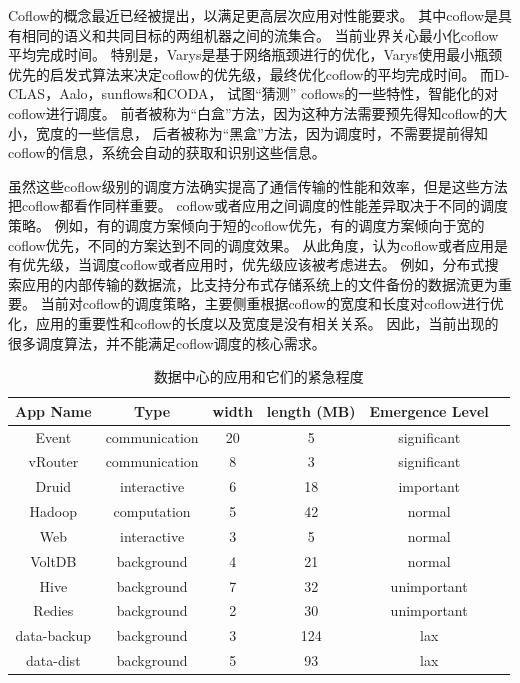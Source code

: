 Coflow的概念最近已经被提出\cite{chowdhury2012coflow}，以满足更高层次应用对性能要求。
其中coflow是具有相同的语义和共同目标的两组机器之间的流集合。
当前业界关心最小化coflow平均完成时间。
特别是，Varys是基于网络瓶颈进行的优化，Varys使用最小瓶颈优先的启发式算法来决定coflow的优先级，最终优化coflow的平均完成时间。
而D-CLAS\cite{luo2016towards}，Aalo\cite{chowdhury2015efficient}，sunflows\cite{huang2016sunflow}和CODA\cite{zhang2016coda}，
试图“猜测” coflows的一些特性，智能化的对coflow进行调度。
前者被称为“白盒”方法，因为这种方法需要预先得知coflow的大小，宽度的一些信息，
后者被称为“黑盒”方法，因为调度时，不需要提前得知coflow的信息，系统会自动的获取和识别这些信息。


虽然这些coflow级别的调度方法确实提高了通信传输的性能和效率，但是这些方法把coflow都看作同样重要。
coflow或者应用之间调度的性能差异取决于不同的调度策略。
例如，有的调度方案倾向于短的coflow优先，有的调度方案倾向于宽的coflow优先，不同的方案达到不同的调度效果。
从此角度，认为coflow或者应用是有优先级，当调度coflow或者应用时，优先级应该被考虑进去。
例如，分布式搜索应用的内部传输的数据流，比支持分布式存储系统上的文件备份的数据流更为重要。
当前对coflow的调度策略，主要侧重根据coflow的宽度和长度对coflow进行优化，应用的重要性和coflow的长度以及宽度是没有相关关系。
因此，当前出现的很多调度算法，并不能满足coflow调度的核心需求。
\begin{table}[h]
\centering
\footnotesize
 \caption{数据中心的应用和它们的紧急程度} \label{Yosemite:measure}
\begin{tabular}{|c|c|c|c|c|c|} \hline
\toprule
App Name  & Type &  width&  length (MB)&Emergence Level\\
\midrule
Event &     communication    &20&5     &  significant \\
vRouter &  communication     &8&3 &  significant\\
Druid&     interactive   &6&18   &  important \\
Hadoop&  computation  &5&42     &  normal \\
Web&     interactive   &3&5     &  normal\\
VoltDB&     background  &4&21    &  normal\\
Hive&     background   &7&32     &  unimportant \\
Redies&    background   &2&30    &  unimportant \\
data-backup&    background   &3&124     &  lax \\
data-dist& background      &5&93  &lax \\
\bottomrule
 \end{tabular}
 \end{table}
 
